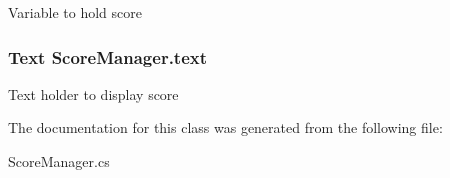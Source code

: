 Variable to hold score 

\hypertarget{classScoreManager_a7ef05edbcfef0503c0e0cc501e71e95e}{
\subsubsection[{text}]{\setlength{\rightskip}{0pt plus 5cm}Text Score\-Manager.\-text}}\label{classScoreManager_a7ef05edbcfef0503c0e0cc501e71e95e}


Text holder to display score 



The documentation for this class was generated from the following file\-:\begin{DoxyCompactItemize}
\item 
Score\-Manager.\-cs\end{DoxyCompactItemize}

